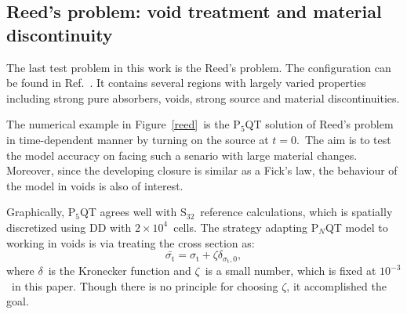 \documentclass[review]{elsarticle}
\newcommand{\st}{\sigma_\mathrm{t}}
\begin{document}



\subsection{Reed's problem: void treatment and material discontinuity}
The last test problem in this work is the Reed's problem. The configuration can be found in Ref.~\cite{reed_1971}. It contains several regions with largely varied properties including strong pure absorbers, voids, strong source and material discontinuities.

The numerical example in Figure~\ref{reed}~is the P$_5$QT solution of Reed's problem in time-dependent manner by turning on the source at $t=0$.~The aim is to test the model accuracy on facing such a senario with large material changes. Moreover, since the developing closure is similar as a Fick's law, the behaviour of the model in voids is also of interest. 

Graphically, P$_5$QT agrees well with S$_{32}$~reference calculations, which is spatially discretized using DD with $2\times10^4$~cells. The strategy adapting P$_N$QT model to working in voids is via treating the cross section as:
\begin{equation}
\bar{\st}=\st+\zeta\delta_{\st,0},
\end{equation}
where $\delta$~is the Kronecker function and $\zeta$~is a small number, which is fixed at $10^{-3}$~in this paper. Though there is no principle for choosing $\zeta$, it accomplished the goal.
\end{document}

